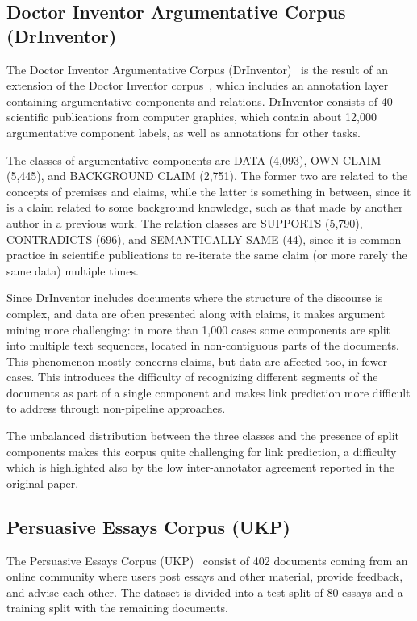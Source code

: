 \documentclass[journal]{IEEEtran}
\begin{document}
\subsection{Doctor Inventor Argumentative Corpus (DrInventor)}
The Doctor Inventor Argumentative Corpus (DrInventor)~\cite{drinv-arg} is the result of an extension of the Doctor Inventor corpus~\cite{drinv-original}, which includes an annotation layer containing argumentative components and relations.
DrInventor consists of 40 scientific publications from computer graphics, which contain about 12,000 argumentative component labels, as well as annotations for other tasks.

The classes of argumentative components are DATA (4,093), OWN CLAIM (5,445), and BACKGROUND CLAIM (2,751). The former two are related to the concepts of premises and claims, while the latter is something in between, since it is a claim related to some background knowledge, such as that made by another author in a previous work. The relation classes are SUPPORTS (5,790), CONTRADICTS (696), and SEMANTICALLY SAME (44), since it is common practice in scientific publications to re-iterate the same claim (or more rarely the same data) multiple times.

Since DrInventor includes documents where the structure of the discourse is complex, and data are often presented along with claims, it makes argument mining more challenging: in more than 1,000 cases some components are split into multiple text sequences, located in non-contiguous parts of the documents. This phenomenon mostly concerns claims, but data are affected too, in fewer cases.
This introduces the difficulty of recognizing different segments of the documents as part of a single component and makes link prediction more difficult to address through non-pipeline approaches.



The unbalanced distribution between the three classes and the presence of split components makes this corpus quite challenging for link prediction, a difficulty which is highlighted also by the low inter-annotator agreement reported in the original paper.



\subsection{Persuasive Essays Corpus (UKP)}
The Persuasive Essays Corpus (UKP)~\cite{stab2017parsing} consist of 402 documents coming from an online community where users post essays and other material, provide feedback, and advise each other. The dataset is divided into a test split of 80 essays and a training split with the remaining documents.
\end{document}
